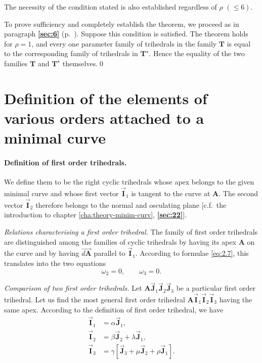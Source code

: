 \documentclass[leqno,11pt]{book}
\numberwithin{equation}{chapter}
\theoremstyle{shape1}
\theoremstyle{shapesmall}
\newcommand{\fsref}[1]{{\rm\textsection\textbf{\ref{sec:#1}}}}
\newcommand{\str}{^{\star}}
\newcommand{\rvec}[1]{\vec{\mathbf{#1}}}
\newcommand{\ivec}{\rvec{I}}
\newcommand{\jvec}{\rvec{J}}
\newcommand{\somespace}{\vspace{9pt}}
\begin{document}
The necessity of the condition stated is also established regardless of $\rho$ $(\le 6)$.

To prove sufficiency and completely establish the theorem, we proceed as in paragraph \fsref{6} (p.~\pageref{sec:6}). Suppose this condition is satisfied. The theorem holds for $\rho=1$, and every one parameter family of trihedrals in the family $\mathbf{T}$ is equal to the corresponding family of trihedrals in $\mathbf{T}\str$. Hence the equality of the two families $\mathbf{T}$ and $\mathbf{T}\str$ themselves.\qed

\section{Definition of the elements of various orders attached to a minimal curve}
\label{sec:defin-elem-vari}

\paragraph{Definition of first order trihedrals.}
\label{sec:27}
We define them to be the right cyclic trihedrals whose apex belongs to the given minimal curve and whose first vector $\ivec_{1}$ is tangent to the curve at $\mathbf{A}$. The second vector $\ivec_{2}$ therefore belongs to the normal and osculating plane [c.f.~the introduction to chapter \ref{cha:theory-minim-curv}, \fsref{22}].

\somespace

\emph{Relations characterising a first order trihedral.} The family of first order trihedrals are distinguished among the families of cyclic trihedrals by having its apex $\mathbf{A}$ on the curve and by having $\overrightarrow{d\mathbf{A}}$ parallel to $\ivec_{1}$. According to formulae \eqref{eq:2.7}, this translates into the two equations
\begin{equation}
  \label{eq:2.10}
  \omega_{2}=0,\qquad\omega_{3}=0.
\end{equation}

\somespace

\emph{Comparison of two first order trihedrals.} Let $\mathbf{A}\jvec_{1}\jvec_{2}\jvec_{3}$ be a particular first order trihedral. Let us find the most general first order trihedral $\mathbf{A}\ivec_{1}\ivec_{2}\ivec_{3}$ having the same apex. According to the definition of first order trihedral, we have
\begin{align*}
  \ivec_{1}&=\alpha\jvec_{1},\\
  \ivec_{2}&=\beta\jvec_{2}+\lambda\jvec_{1},\\
  \ivec_{3}&=\gamma[\jvec_{3}+\mu\jvec_{2}+\rho\jvec_{1}].
\end{align*}
\end{document}
